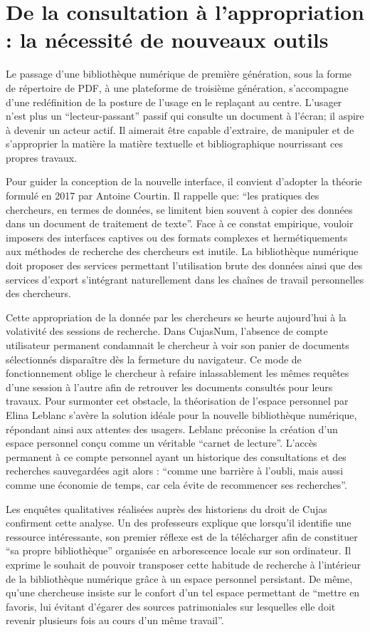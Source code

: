 \section[De la consultation à l'appropriation]{De la consultation à l'appropriation : la nécessité de nouveaux outils}
Le passage d'une bibliothèque numérique de première génération, sous la forme de répertoire de PDF, à une plateforme de troisième génération, s'accompagne d'une redéfinition de la posture de l'usage en le replaçant au centre. L'usager n'est plus un \enquote{lecteur-passant} passif qui consulte un document à l'écran; il aspire à devenir un acteur actif. Il aimerait être capable d'extraire, de manipuler et de s'approprier la matière la matière textuelle et bibliographique nourrissant ces propres travaux. 

Pour guider la conception de la nouvelle interface, il convient d'adopter la théorie formulé en 2017 par Antoine Courtin. Il rappelle que: \enquote{les pratiques des chercheurs, en termes de données, se limitent bien souvent à copier des données dans un document de traitement de texte}. Face à ce constat empirique, vouloir imposers des interfaces captives ou des formats complexes et hermétiquements aux méthodes de recherche des chercheurs est inutile. La bibliothèque numérique doit proposer des services permettant l'utilisation brute des données ainsi que des services d'export s'intégrant naturellement dans les chaînes de travail personnelles des chercheurs.

Cette appropriation de la donnée par les chercheurs se heurte aujourd'hui à la volativité des sessions de recherche. Dans CujasNum, l'absence de compte utilisateur permanent condamnait le chercheur à voir son panier de documents sélectionnés disparaître dès la fermeture du navigateur. Ce mode de fonctionnement oblige le chercheur à refaire inlassablement les mêmes requêtes d'une session à l'autre afin de retrouver les documents consultés pour leurs travaux. Pour surmonter cet obstacle, la théorisation de l'espace personnel par Elina Leblanc s'avère la solution idéale pour la nouvelle bibliothèque numérique, répondant ainsi aux attentes des usagers. Leblanc préconise la  création d'un espace personnel conçu comme un véritable \enquote{carnet de lecture}. L'accès permanent à ce compte personnel ayant un historique des consultations et des recherches sauvegardées agit alors : \enquote{comme une barrière à l'oubli, mais aussi comme une économie de temps, car cela évite de recommencer ses recherches}. 

Les enquêtes qualitatives réalisées auprès des historiens du droit de Cujas confirment cette analyse. Un des professeurs explique que lorsqu'il identifie une ressource intéressante, son premier réflexe est de la télécharger afin de constituer \enquote{sa propre bibliothèque} organisée en arborescence locale sur son ordinateur. Il exprime le souhait de pouvoir transposer cette habitude de recherche à l'intérieur de la bibliothèque numérique grâce à un espace personnel persistant. De même, qu'une chercheuse insiste sur le confort d'un tel espace permettant de \enquote{mettre en favoris, lui évitant d'égarer des sources patrimoniales sur lesquelles elle doit revenir plusieurs fois au cours d'un même travail}.

